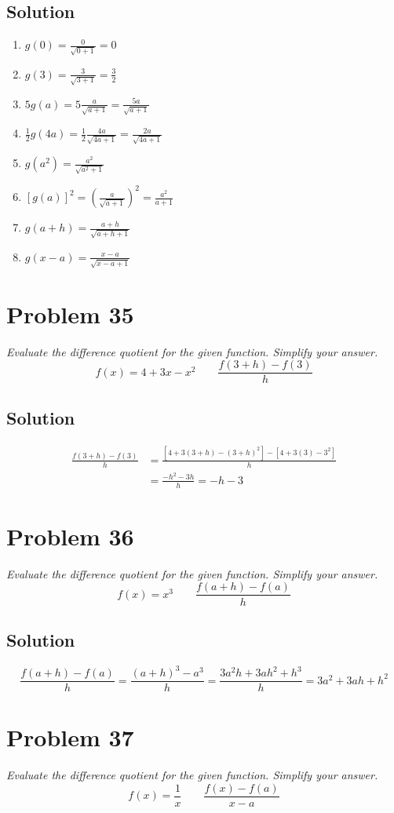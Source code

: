 \documentclass[11pt]{article}
\newcommand{\soln}{\subsection*}
\newcommand{\qn}{\textit}
\begin{document}
\soln{Solution}
\begin{enumerate}
	\item $g(0)=\frac{0}{\sqrt{0+1}}=0$
	\item $g(3)=\frac{3}{\sqrt{3+1}}=\frac{3}{2}$
	\item $5g(a)=5\frac{a}{\sqrt{a+1}}=\frac{5a}{\sqrt{a+1}}$
	\item $\frac{1}{2}g(4a)=\frac{1}{2}\frac{4a}{\sqrt{4a+1}}=\frac{2a}{\sqrt{4a+1}}$
	\item $g(a^2)=\frac{a^2}{\sqrt{a^2+1}}$
	\item $[g(a)]^2=(\frac{a}{\sqrt{a+1}})^2=\frac{a^2}{a+1}$
	\item $g(a+h)=\frac{a+h}{\sqrt{a+h+1}}$
	\item $g(x-a)=\frac{x-a}{\sqrt{x-a+1}}$
\end{enumerate}

\section*{Problem 35}

\qn{Evaluate the difference quotient for the given function. Simplify your answer. $$f(x)=4+3x-x^2 \qquad \frac{f(3+h)-f(3)}{h}$$}

\soln{Solution}
\begin{equation*}
	\begin{split}
		\frac{f(3+h)-f(3)}{h} &= \frac{[4+3(3+h)-(3+h)^2]-[4+3(3)-3^2]}{h} \\
							  &= \frac{-h^2-3h}{h} = -h-3
	\end{split}
\end{equation*}

\section*{Problem 36}

\qn{Evaluate the difference quotient for the given function. Simplify your answer. $$f(x)=x^3 \qquad \frac{f(a+h)-f(a)}{h}$$}

\soln{Solution}
\begin{equation*}
	\frac{f(a+h)-f(a)}{h} = \frac{(a+h)^3-a^3}{h} = \frac{3a^2h+3ah^2+h^3}{h} = 3a^2+3ah+h^2
\end{equation*}

\section*{Problem 37}

\qn{Evaluate the difference quotient for the given function. Simplify your answer. $$f(x)=\frac{1}{x} \qquad \frac{f(x)-f(a)}{x-a}$$}
\end{document}
